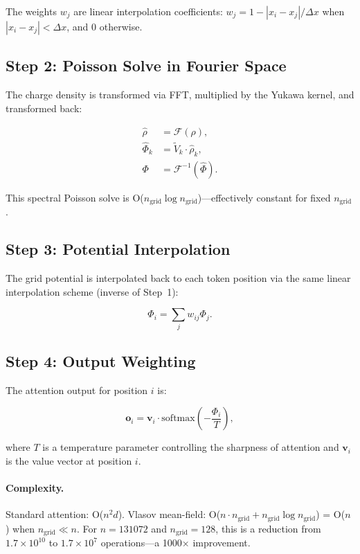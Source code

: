 \documentclass[11pt,a4paper,openright]{book}
\begin{document}
The weights $w_j$ are linear interpolation coefficients: $w_j = 1 - |x_i - x_j|/\Delta x$ when $|x_i - x_j| < \Delta x$, and 0 otherwise.

\subsection{Step 2: Poisson Solve in Fourier Space}

The charge density is transformed via FFT, multiplied by the Yukawa kernel, and transformed back:

\begin{align}
	\hat{\rho}   & = \mathcal{F}(\rho),              \\
	\hat{\Phi}_k & = \tilde{V}_k \cdot \hat{\rho}_k, \\
	\Phi         & = \mathcal{F}^{-1}(\hat{\Phi}).
\end{align}

This spectral Poisson solve is O($n_\text{grid} \log n_\text{grid}$)---effectively constant for fixed $n_\text{grid}$.

\subsection{Step 3: Potential Interpolation}

The grid potential is interpolated back to each token position via the same linear interpolation scheme (inverse of Step~1):

\begin{equation}
	\label{eq:potential_interp}
	\Phi_i = \sum_j w_{ij} \Phi_j.
\end{equation}

\subsection{Step 4: Output Weighting}

The attention output for position $i$ is:

\begin{equation}
	\label{eq:mean_field_output}
	\mathbf{o}_i = \mathbf{v}_i \cdot \text{softmax}\left(-\frac{\Phi_i}{T}\right),
\end{equation}

where $T$ is a temperature parameter controlling the sharpness of attention and $\mathbf{v}_i$ is the value vector at position $i$.

\paragraph{Complexity.}
Standard attention: O($n^2 d$). Vlasov mean-field: O($n \cdot n_\text{grid} + n_\text{grid} \log n_\text{grid}$) = O($n$) when $n_\text{grid} \ll n$. For $n=131072$ and $n_\text{grid}=128$, this is a reduction from $1.7 \times 10^{10}$ to $1.7 \times 10^7$ operations---a 1000$\times$ improvement.
\end{document}
